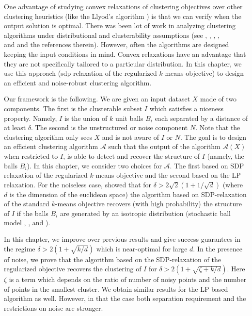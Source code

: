 \documentclass[12pt]{article}
\newcommand{\mc}{\mathcal}
\begin{document}
One advantage of studying convex relaxations of clustering objectives over other clustering heuristics (like the Llyod's algorithm \cite{lloyd1982least}) is that we can verify when the output solution is optimal. There was been lot of work in analyzing clustering algorithms under distributional and clusterability assumptions (see \cite{balcan2012clustering}, \cite{awasthi2012center}, \cite{kalai2010efficiently}, \cite{achlioptas2005spectral}, \\\cite{sanjeev2001learning} and \cite{hsu2013learning} and the references therein). However, often the algorithms are designed keeping the input conditions in mind. Convex relaxations have an advantage that they are not specifically tailored to a particular distribution. In this chapter, we use this approach (sdp relaxation of the regularized $k$-means objective) to design an efficient and noise-robust clustering algorithm.

Our framework is the following. We are given an input dataset $X$ made of two components. The first is the clusterable subset $I$ which satisfies a niceness property. Namely, $I$ is the union of $k$ unit balls $B_i$ each separated by a distance of at least $\delta$. The second is the unstructured or noise component $N$. Note that the clustering algorithm only sees $X$ and is not aware of $I$ or $N$. The goal is to design an efficient clustering algorithm $\mc A$ such that the output of the algorithm $\mc A(X)$ when restricted to $I$, is able to detect and recover the structure of $I$ (namely, the balls $B_i$). In this chapter, we consider two choices for $\mc A$. The first based on SDP relaxation of the regularized $k$-means objective and the second based on the LP relaxation. For the noiseless case, \cite{awasthi2015relax} showed that for $\delta > 2\sqrt{2}(1+1/\sqrt d)$ (where $d$ is the dimension of the euclidean space) the algorithm based on SDP-relaxation of the standard $k$-means objective recovers (with high probability) the structure of $I$ if the balls $B_i$ are generated by an isotropic distribution (stochastic ball model \cite{iguchi2015tightness}, \cite{iguchi2017probably}, \cite{awasthi2015relax} and \cite{nellore2015recovery}).

In this chapter, we improve over previous results and give success guarantees in the regime $\delta > 2(1+\sqrt{k/d})$ which is near-optimal for large $d$. In the presence of noise, we prove that the algorithm based on the SDP-relaxation of the regularized objective recovers the clustering of $I$ for $\delta > 2(1+\sqrt{\zeta + k/d})$. Here $\zeta$ is a term which depends on the ratio of number of noisy points and the number of points in the smallest cluster. We obtain similar results for the LP based algorithm as well. However, in that the case both separation requirement and the restrictions on noise are stronger.  
\end{document}
